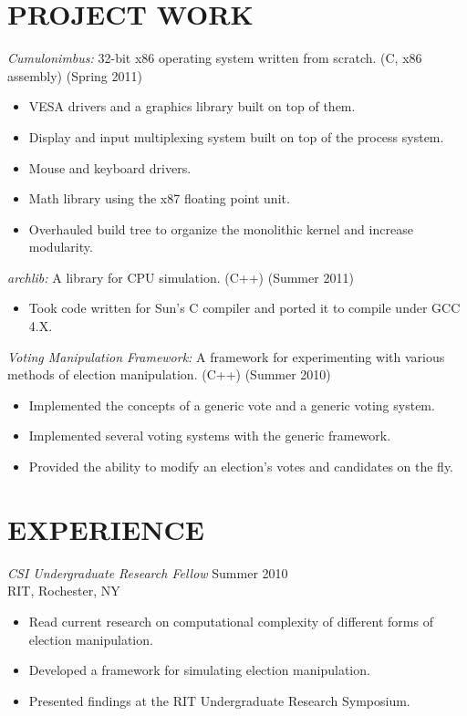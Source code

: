 \documentclass[margin]{res}
\begin{document}
\begin{resume}
\section{PROJECT WORK}
                 {\sl Cumulonimbus:} 32-bit x86 operating system written from scratch. (C, x86 assembly) (Spring 2011)
                 \begin{itemize} \itemsep -2pt
                    \item VESA drivers and a graphics library built on top of them.
                    \item Display and input multiplexing system built on top of the process system.
                    \item Mouse and keyboard drivers.
                    \item Math library using the x87 floating point unit.
                    \item Overhauled build tree to organize the monolithic kernel and increase modularity.
                  \end{itemize}

                  {\sl archlib:} A library for CPU simulation. (C++) (Summer 2011)
                  \begin{itemize} \itemsep -2pt
                    \item Took code written for Sun's C compiler and ported it to compile under GCC 4.X.
                  \end{itemize}

                  {\sl Voting Manipulation Framework:} A framework for experimenting with various methods of election manipulation. (C++) (Summer 2010)
                  \begin{itemize} \itemsep -2pt
                    \item Implemented the concepts of a generic vote and a generic voting system.
                    \item Implemented several voting systems with the generic framework.
                    \item Provided the ability to modify an election's votes and candidates on the fly. 
                  \end{itemize}
                    
\section{EXPERIENCE} {\sl CSI Undergraduate Research Fellow} \hfill            Summer 2010 \\
                 RIT, Rochester, NY
                 \begin{itemize}  \itemsep -2pt %
                    \item Read current research on computational complexity of different forms of election manipulation.
                    \item Developed a framework for simulating election manipulation.
                    \item Presented findings at the RIT Undergraduate Research Symposium.
                \end{itemize}
 

\end{resume}
\end{document}
